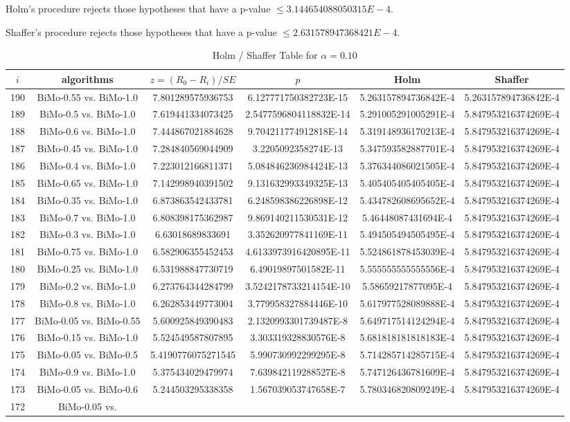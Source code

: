 \documentclass[a4paper,10pt]{article}
\begin{document}
\begin{landscape}
Holm's procedure rejects those hypotheses that have a p-value $\le3.144654088050315E-4$.


Shaffer's procedure rejects those hypotheses that have a p-value $\le2.631578947368421E-4$.


\begin{table}[!htp]
\centering\tiny
\caption{Holm / Shaffer Table for $\alpha=0.10$}
\begin{tabular}{cccccc}
$i$&algorithms&$z=(R_0 - R_i)/SE$&$p$&Holm&Shaffer\\
\hline
190&BiMo-0.55 vs. BiMo-1.0&7.801289575936753&6.127771750382723E-15&5.263157894736842E-4&5.263157894736842E-4\\189&BiMo-0.5 vs. BiMo-1.0&7.619441334073425&2.5477596804118832E-14&5.291005291005291E-4&5.847953216374269E-4\\188&BiMo-0.6 vs. BiMo-1.0&7.444867021884628&9.704211774912818E-14&5.319148936170213E-4&5.847953216374269E-4\\187&BiMo-0.45 vs. BiMo-1.0&7.284840569044909&3.2205092358274E-13&5.347593582887701E-4&5.847953216374269E-4\\186&BiMo-0.4 vs. BiMo-1.0&7.223012166811371&5.084846236984424E-13&5.376344086021505E-4&5.847953216374269E-4\\185&BiMo-0.65 vs. BiMo-1.0&7.142998940391502&9.131632993349325E-13&5.405405405405405E-4&5.847953216374269E-4\\184&BiMo-0.35 vs. BiMo-1.0&6.873863542433781&6.248598386226898E-12&5.434782608695652E-4&5.847953216374269E-4\\183&BiMo-0.7 vs. BiMo-1.0&6.808398175362987&9.869140211530531E-12&5.46448087431694E-4&5.847953216374269E-4\\182&BiMo-0.3 vs. BiMo-1.0&6.63018689833691&3.352620977841169E-11&5.494505494505495E-4&5.847953216374269E-4\\181&BiMo-0.75 vs. BiMo-1.0&6.582906355452453&4.6133973916420895E-11&5.524861878453039E-4&5.847953216374269E-4\\180&BiMo-0.25 vs. BiMo-1.0&6.531988847730719&6.49019897501582E-11&5.555555555555556E-4&5.847953216374269E-4\\179&BiMo-0.2 vs. BiMo-1.0&6.273764344284799&3.5242178733214154E-10&5.58659217877095E-4&5.847953216374269E-4\\178&BiMo-0.8 vs. BiMo-1.0&6.262853449773004&3.779958327884446E-10&5.617977528089888E-4&5.847953216374269E-4\\177&BiMo-0.05 vs. BiMo-0.55&5.600925849390483&2.1320993301739487E-8&5.649717514124294E-4&5.847953216374269E-4\\176&BiMo-0.15 vs. BiMo-1.0&5.524549587807895&3.303319328830576E-8&5.681818181818183E-4&5.847953216374269E-4\\175&BiMo-0.05 vs. BiMo-0.5&5.4190776075271545&5.990730992299295E-8&5.714285714285715E-4&5.847953216374269E-4\\174&BiMo-0.9 vs. BiMo-1.0&5.375434029479974&7.639842119288527E-8&5.747126436781609E-4&5.847953216374269E-4\\173&BiMo-0.05 vs. BiMo-0.6&5.244503295338358&1.567039053747658E-7&5.780346820809249E-4&5.847953216374269E-4\\172&BiMo-0.05 vs. 
\end{tabular}
\end{table}
\end{landscape}
\end{document}
